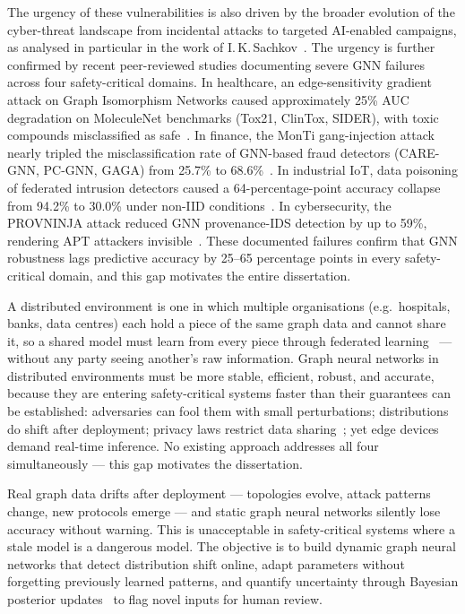 The urgency of these vulnerabilities is also driven by the broader evolution of the cyber-threat landscape from incidental attacks to targeted AI-enabled campaigns, as analysed in particular in the work of I.\,K.\,Sachkov~\cite{Sachkov2022threat}. The urgency is further confirmed by recent peer-reviewed studies documenting severe GNN failures across four safety-critical domains. In healthcare, an edge-sensitivity gradient attack on Graph Isomorphism Networks caused approximately 25\% AUC degradation on MoleculeNet benchmarks (Tox21, ClinTox, SIDER), with toxic compounds misclassified as safe~\cite{EdgeSensitivity2025}. In finance, the MonTi gang-injection attack nearly tripled the misclassification rate of GNN-based fraud detectors (CARE-GNN, PC-GNN, GAGA) from 25.7\% to 68.6\%~\cite{MonTi2025}. In industrial IoT, data poisoning of federated intrusion detectors caused a 64-percentage-point accuracy collapse from 94.2\% to 30.0\% under non-IID conditions~\cite{FerragPoisoning2023}. In cybersecurity, the PROVNINJA attack reduced GNN provenance-IDS detection by up to 59\%, rendering APT attackers invisible~\cite{PROVNINJA2023}. These documented failures confirm that GNN robustness lags predictive accuracy by 25--65 percentage points in every safety-critical domain, and this gap motivates the entire dissertation.

A distributed environment is one in which multiple organisations (e.g.\ hospitals, banks, data centres) each hold a piece of the same graph data and cannot share it, so a shared model must learn from every piece through federated learning~\cite{Blanchard2017} --- without any party seeing another's raw information. Graph neural networks in distributed environments must be more stable, efficient, robust, and accurate, because they are entering safety-critical systems faster than their guarantees can be established: adversaries can fool them with small perturbations; distributions do shift after deployment; privacy laws restrict data sharing~\cite{Dwork2006,Abadi2016}; yet edge devices demand real-time inference. No existing approach addresses all four simultaneously --- this gap motivates the dissertation.

Real graph data drifts after deployment --- topologies evolve, attack patterns change, new protocols emerge --- and static graph neural networks silently lose accuracy without warning. This is unacceptable in safety-critical systems where a stale model is a dangerous model. The objective is to build dynamic graph neural networks that detect distribution shift online, adapt parameters without forgetting previously learned patterns, and quantify uncertainty through Bayesian posterior updates~\cite{Gal2016,Kendall2017} to flag novel inputs for human review.

